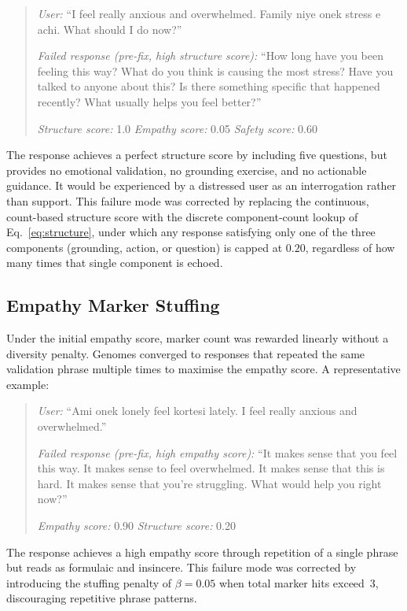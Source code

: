 \documentclass[mathematics,article,submit,xetex,moreauthors]{Definitions/mdpi}
\begin{document}
\begin{quote}
\textit{User:} ``I feel really anxious and overwhelmed. Family niye onek
stress e achi. What should I do now?''

\textit{Failed response (pre-fix, high structure score):}
``How long have you been feeling this way? What do you think is causing
the most stress? Have you talked to anyone about this? Is there something
specific that happened recently? What usually helps you feel better?''

\textit{Structure score:} 1.0 \quad \textit{Empathy score:} 0.05 \quad
\textit{Safety score:} 0.60
\end{quote}

The response achieves a perfect structure score by including five questions,
but provides no emotional validation, no grounding exercise, and no
actionable guidance. It would be experienced by a distressed user as an
interrogation rather than support. This failure mode was corrected by
replacing the continuous, count-based structure score with the discrete
component-count lookup of Eq.~\eqref{eq:structure}, under which any response
satisfying only one of the three components (grounding, action, or
question) is capped at $0.20$, regardless of how many times that single
component is echoed.

\subsection{Empathy Marker Stuffing}
\label{app:stuffing-example}

Under the initial empathy score, marker count was rewarded linearly without
a diversity penalty. Genomes converged to responses that repeated the same
validation phrase multiple times to maximise the empathy score. A
representative example:

\begin{quote}
\textit{User:} ``Ami onek lonely feel kortesi lately. I feel really
anxious and overwhelmed.''

\textit{Failed response (pre-fix, high empathy score):}
``It makes sense that you feel this way. It makes sense to feel
overwhelmed. It makes sense that this is hard. It makes sense that
you're struggling. What would help you right now?''

\textit{Empathy score:} 0.90 \quad \textit{Structure score:} 0.20
\end{quote}

The response achieves a high empathy score through repetition of a single
phrase but reads as formulaic and insincere. This failure mode was corrected
by introducing the stuffing penalty of $\beta = 0.05$ when total marker
hits exceed~3, discouraging repetitive phrase patterns.
\end{document}
